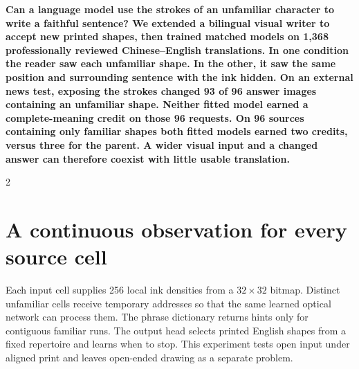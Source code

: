 \noindent\textbf{Can a language model use the strokes of an unfamiliar character to write a faithful sentence? We extended a bilingual visual writer to accept new printed shapes, then trained matched models on 1,368 professionally reviewed Chinese--English translations. In one condition the reader saw each unfamiliar shape. In the other, it saw the same position and surrounding sentence with the ink hidden. On an external news test, exposing the strokes changed 93 of 96 answer images containing an unfamiliar shape. Neither fitted model earned a complete-meaning credit on those 96 requests. On 96 sources containing only familiar shapes both fitted models earned two credits, versus three for the parent. A wider visual input and a changed answer can therefore coexist with little usable translation.}\par
\begin{multicols}{2}
\section*{A continuous observation for every source cell}
Each input cell supplies 256 local ink densities from a $32\times32$ bitmap. Distinct unfamiliar cells receive temporary addresses so that the same learned optical network can process them. The phrase dictionary returns hints only for contiguous familiar runs. The output head selects printed English shapes from a fixed repertoire and learns when to stop. This experiment tests open input under aligned print and leaves open-ended drawing as a separate problem.
\end{multicols}
